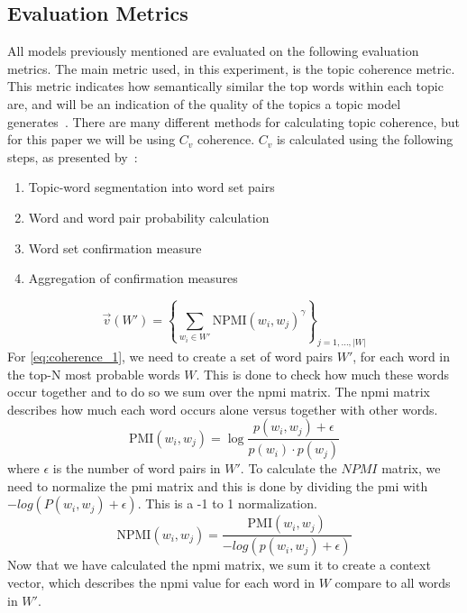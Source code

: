 \subsection{Evaluation Metrics}\label{sec:experiment_metrics}
All models previously mentioned are evaluated on the following evaluation metrics.
The main metric used, in this experiment, is the topic coherence metric.
This metric indicates how semantically similar the top words within each topic are, and will be an indication of the quality of the topics a topic model generates~\cite{topic_coherence_2015}.
There are many different methods for calculating topic coherence, but for this paper we will be using $C_v$ coherence.
$C_v$ is calculated using the following steps, as presented by~\citet{Syed2017coherence}:
\begin{enumerate}
	\item Topic-word segmentation into word set pairs
	\item Word and word pair probability calculation
	\item Word set confirmation measure
	\item Aggregation of confirmation measures
\end{enumerate}
\begin{equation}\label{eq:coherence_1}
	\overrightarrow{v}(W') = \left\{ \sum_{w_i \in W'} \text{NPMI}(w_i, w_j)^\gamma \right\}_{j=1,\dots,|W|}
\end{equation}
For \autoref{eq:coherence_1}, we need to create a set of word pairs $W'$, for each word in the top-N most probable words $W$.
This is done to check how much these words occur together and to do so we sum over the \gls{npmi} matrix.
The \gls{npmi} matrix describes how much each word occurs alone versus together with other words. 
\begin{equation}\label{eq:pmi}
	\text{PMI}(w_i,w_j) = \log\frac{p(w_i,w_j) + \epsilon}{p(w_i)\cdot p(w_j)}
\end{equation}
where $\epsilon$ is the number of word pairs in $W'$. 
To calculate the $NPMI$ matrix, we need to normalize the \gls{pmi} matrix and this is done by dividing the \gls{pmi} with $-log(P(w_i,w_j) + \epsilon)$.
This is a -1 to 1 normalization.
\begin{equation}\label{eq:coherence_2}
	\text{NPMI}(w_i,w_j) =  \frac{\text{PMI}(w_i, w_j)}{-log(p(w_i,w_j) + \epsilon)}
\end{equation}
Now that we have calculated the \gls{npmi} matrix, we sum it to create a context vector, which describes the \gls{npmi} value for each word in $W$ compare to all words in $W'$.
